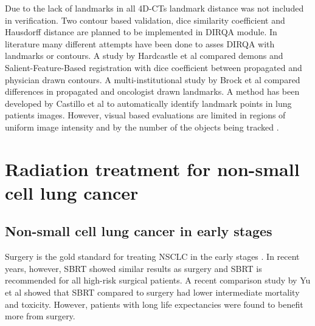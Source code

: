 \documentclass[type=dr, dr=rernat, accentcolor=tud7b,colorbacktitle, bigchapter, openright, twoside, 12pt ]{tudthesis}
\begin{document}

Due to the lack of landmarks in all 4D-CTs landmark distance was not included in verification. Two contour based validation, dice similarity coefficient \cite{Varadhan2013} and Hausdorff distance \cite{Huttenlocher1993}
are planned to be implemented in DIRQA module. In literature many different attempts have been done to asses DIRQA with landmarks or contours. 
A study by Hardcastle et al \cite{Hardcastle2012} 
compared demons and Salient-Feature-Based registration with dice coefficient between propagated and physician drawn contours.
A multi-institutional study by Brock et al \cite{Brock2010} compared differences in propagated and oncologist drawn landmarks. 
A method has been developed by Castillo et al \cite{Castillo2009} to automatically identify landmark points
in lung patients images. However, visual based evaluations are limited in regions of uniform image intensity and by the number of the objects being tracked \cite{Kashani2008, Liu2012}.



\newpage
\section{Radiation treatment for non-small cell lung cancer}

\subsection{Non-small cell lung cancer in early stages}

Surgery is the gold standard for treating NSCLC in the early stages \cite{Roesch2014}. 
In recent years, however, SBRT showed similar results as surgery and SBRT is recommended for all high-risk surgical patients. A recent comparison study by Yu et al \cite{Yu2015} showed that
SBRT compared to surgery had lower intermediate mortality and toxicity. However, patients with long life expectancies were found to benefit more from surgery. 
\end{document}

